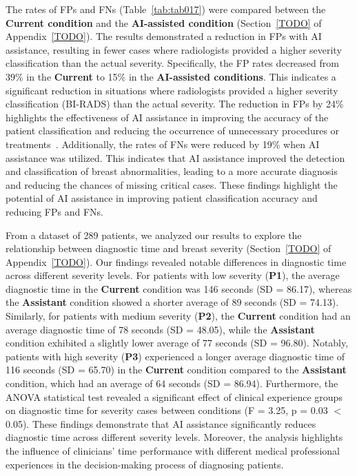 The rates of \acp{FP} and \acp{FN} (Table~\ref{tab:tab017}) were compared between the {\bf Current condition} and the {\bf AI-assisted condition} (Section~\ref{TODO} of Appendix~\ref{TODO}).
The results demonstrated a reduction in \acp{FP} with AI assistance, resulting in fewer cases where radiologists provided a higher severity classification than the actual severity.
Specifically, the \ac{FP} rates decreased from 39\% in the {\bf Current} to 15\% in the {\bf AI-assisted conditions}.
This indicates a significant reduction in situations where radiologists provided a higher severity classification (\ac{BI-RADS}) than the actual severity.
The reduction in \acp{FP} by 24\% highlights the effectiveness of \ac{AI} assistance in improving the accuracy of the patient classification and reducing the occurrence of unnecessary procedures or treatments~\cite{10.1001/jamainternmed.2014.981}.
Additionally, the rates of \acp{FN} were reduced by 19\% when \ac{AI} assistance was utilized.
This indicates that \ac{AI} assistance improved the detection and classification of breast abnormalities, leading to a more accurate diagnosis and reducing the chances of missing critical cases.
These findings highlight the potential of AI assistance in improving patient classification accuracy and reducing \acp{FP} and \acp{FN}.



From a dataset of 289 patients, we analyzed our results to explore the relationship between diagnostic time and breast severity (Section~\ref{TODO} of Appendix~\ref{TODO}).
Our findings revealed notable differences in diagnostic time across different severity levels.
For patients with low severity ({\bf P1}), the average diagnostic time in the {\bf Current} condition was 146 seconds (SD = 86.17), whereas the {\bf Assistant} condition showed a shorter average of 89 seconds (SD = 74.13).
Similarly, for patients with medium severity ({\bf P2}), the {\bf Current} condition had an average diagnostic time of 78 seconds (SD = 48.05), while the {\bf Assistant} condition exhibited a slightly lower average of 77 seconds (SD = 96.80).
Notably, patients with high severity ({\bf P3}) experienced a longer average diagnostic time of 116 seconds (SD = 65.70) in the {\bf Current} condition compared to the {\bf Assistant} condition, which had an average of 64 seconds (SD = 86.94).
Furthermore, the \ac{ANOVA} statistical test revealed a significant effect of clinical experience groups on diagnostic time for severity cases between conditions (F = 3.25, p = 0.03 $<$ 0.05).
These findings demonstrate that \ac{AI} assistance significantly reduces diagnostic time across different severity levels.
Moreover, the analysis highlights the influence of clinicians' time performance with different medical professional experiences in the decision-making process of diagnosing patients.

